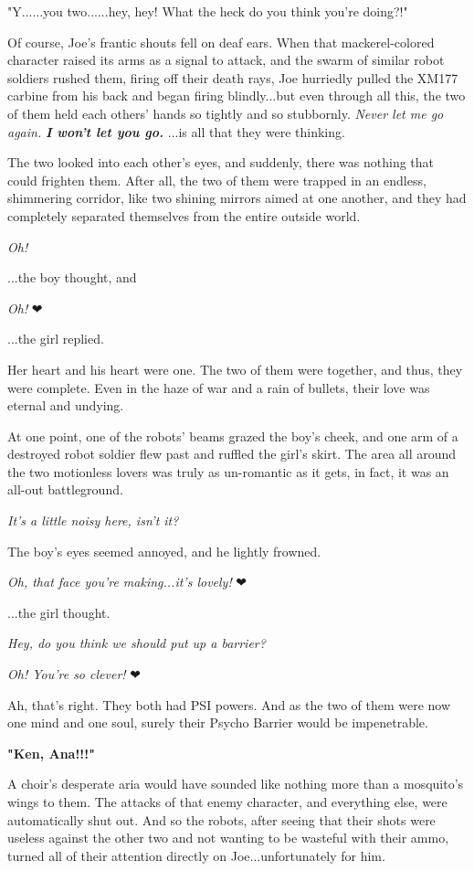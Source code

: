 \documentclass[
]{article}
\begin{document}
"Y......you two......hey, hey! What the heck do you think you're
doing?!"

Of course, Joe's frantic shouts fell on deaf ears. When that
mackerel-colored character raised its arms as a signal to attack, and
the swarm of similar robot soldiers rushed them, firing off their death
rays, Joe hurriedly pulled the XM177 carbine from his back and began
firing blindly...but even through all this, the two of them held each
others' hands so tightly and so stubbornly. \emph{Never let me go
again.} \emph{\textbf{I won't let you go.}} ...is all that they were
thinking.

The two looked into each other's eyes, and suddenly, there was nothing
that could frighten them. After all, the two of them were trapped in an
endless, shimmering corridor, like two shining mirrors aimed at one
another, and they had completely separated themselves from the entire
outside world.

\emph{Oh!}

...the boy thought, and

\emph{Oh! }❤

...the girl replied.

Her heart and his heart were one. The two of them were together, and
thus, they were complete. Even in the haze of war and a rain of bullets,
their love was eternal and undying.

At one point, one of the robots' beams grazed the boy's cheek, and one
arm of a destroyed robot soldier flew past and ruffled the girl's skirt.
The area all around the two motionless lovers was truly as un-romantic
as it gets, in fact, it was an all-out battleground.

\emph{It's a little noisy here, isn't it?}

The boy's eyes seemed annoyed, and he lightly frowned.

\emph{Oh, that face you're making...it's lovely! }❤

...the girl thought.

\emph{Hey, do you think we should put up a barrier?}

\emph{Oh! You're so clever!} ❤

Ah, that's right. They both had PSI powers. And as the two of them were
now one mind and one soul, surely their Psycho Barrier would be
impenetrable.

\textbf{"Ken, Ana!!!"}

A choir's desperate aria would have sounded like nothing more than a
mosquito's wings to them. The attacks of that enemy character, and
everything else, were automatically shut out. And so the robots, after
seeing that their shots were useless against the other two and not
wanting to be wasteful with their ammo, turned all of their attention
directly on Joe...unfortunately for him.
\end{document}
